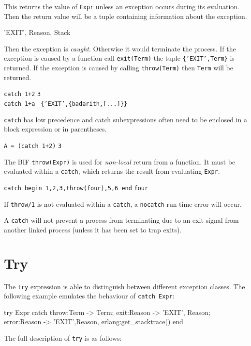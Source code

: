 This returns the value of \texttt{Expr} unless an exception occurs
during its evaluation. Then the return value will be a tuple
containing information about the exception.

\begin{erlang}
{'EXIT', {Reason, Stack}}
\end{erlang}

Then the exception is \textit{caught}. Otherwise it would terminate
the process. If the exception is caused by a function call
\texttt{exit(Term)} the tuple \texttt{\{'EXIT',Term\}} is returned. If
the exception is caused by calling \texttt{throw(Term)} then
\texttt{Term} will be returned.

\texttt{catch 1+2} \resultingin \texttt{3}\\
\texttt{catch 1+a } \resultingin \texttt{\{'EXIT',\{badarith,[...]\}\}}

\texttt{catch} has low precedence and catch subexpressions often need
to be enclosed in a block expression or in parentheses.

\texttt{A = (catch 1+2)} \resultingin \texttt{3}

The BIF \texttt{throw(Expr)} is used for \textit{non-local} return
from a function. It must be evaluated within a \texttt{catch}, which returns
the result from evaluating \texttt{Expr}.

\texttt{catch begin 1,2,3,throw(four),5,6 end} \resultingin \texttt{four}

If \texttt{throw/1} is not evaluated within a \texttt{catch}, a
\texttt{nocatch} run-time error will occur.

A \texttt{catch} will not prevent a process from terminating due to an exit
signal from another linked process (unless it has been set to trap
exits).


\section{Try}
\label{errorhandling:try}
The \texttt{try} expression is able to distinguish between different exception
classes.  The following example emulates the behaviour of \texttt{catch Expr}:

\begin{erlang}
try Expr
catch
    throw:Term -> Term;
    exit:Reason -> {'EXIT', Reason};
    error:Reason -> {'EXIT',{Reason, erlang:get_stacktrace()}}
end
\end{erlang}

The full description of \texttt{try} is as follows:

